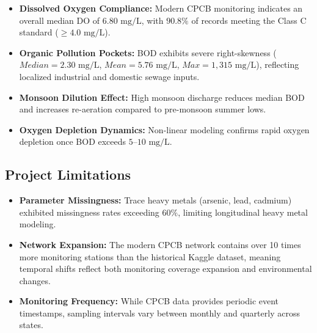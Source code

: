\documentclass[
]{article}
\providecommand{\tightlist}{%
  \setlength{\itemsep}{0pt}\setlength{\parskip}{0pt}}
\begin{document}
\begin{itemize}
\tightlist
\item
  \textbf{Dissolved Oxygen Compliance:} Modern CPCB monitoring indicates
  an overall median DO of \(6.80\text{ mg/L}\), with \(90.8\%\) of
  records meeting the Class C standard (\(\ge 4.0\text{ mg/L}\)).
\item
  \textbf{Organic Pollution Pockets:} BOD exhibits severe right-skewness
  (\(Median = 2.30\text{ mg/L}\), \(Mean = 5.76\text{ mg/L}\),
  \(Max = 1,315\text{ mg/L}\)), reflecting localized industrial and
  domestic sewage inputs.
\item
  \textbf{Monsoon Dilution Effect:} High monsoon discharge reduces
  median BOD and increases re-aeration compared to pre-monsoon summer
  lows.
\item
  \textbf{Oxygen Depletion Dynamics:} Non-linear modeling confirms rapid
  oxygen depletion once BOD exceeds \(5–10\text{ mg/L}\).
\end{itemize}

\subsection{Project Limitations}\label{project-limitations}

\begin{itemize}
\tightlist
\item
  \textbf{Parameter Missingness:} Trace heavy metals (arsenic, lead,
  cadmium) exhibited missingness rates exceeding \(60\%\), limiting
  longitudinal heavy metal modeling.
\item
  \textbf{Network Expansion:} The modern CPCB network contains over 10
  times more monitoring stations than the historical Kaggle dataset,
  meaning temporal shifts reflect both monitoring coverage expansion and
  environmental changes.
\item
  \textbf{Monitoring Frequency:} While CPCB data provides periodic event
  timestamps, sampling intervals vary between monthly and quarterly
  across states.
\end{itemize}
\end{document}
